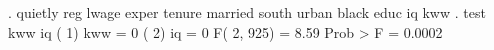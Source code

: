 . quietly reg lwage exper tenure married south urban black educ iq kww
{\smallskip}
. test kww iq
{\smallskip}
 ( 1)  kww = 0
 ( 2)  iq = 0
{\smallskip}
       F(  2,   925) =    8.59
            Prob > F =    0.0002
{\smallskip}
